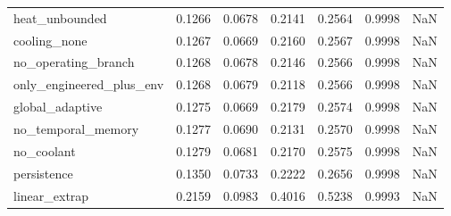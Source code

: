 \begin{tabular}{lrrrrrr}
heat\_unbounded & 0.1266 & 0.0678 & 0.2141 & 0.2564 & 0.9998 & NaN \\
cooling\_none & 0.1267 & 0.0669 & 0.2160 & 0.2567 & 0.9998 & NaN \\
no\_operating\_branch & 0.1268 & 0.0678 & 0.2146 & 0.2566 & 0.9998 & NaN \\
only\_engineered\_plus\_env & 0.1268 & 0.0679 & 0.2118 & 0.2566 & 0.9998 & NaN \\
global\_adaptive & 0.1275 & 0.0669 & 0.2179 & 0.2574 & 0.9998 & NaN \\
no\_temporal\_memory & 0.1277 & 0.0690 & 0.2131 & 0.2570 & 0.9998 & NaN \\
no\_coolant & 0.1279 & 0.0681 & 0.2170 & 0.2575 & 0.9998 & NaN \\
persistence & 0.1350 & 0.0733 & 0.2222 & 0.2656 & 0.9998 & NaN \\
linear\_extrap & 0.2159 & 0.0983 & 0.4016 & 0.5238 & 0.9993 & NaN \\
\bottomrule
\end{tabular}
